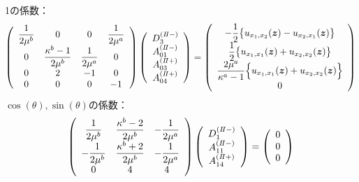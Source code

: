 1の係数：
\begin{align}
	\left(
	\begin{array}{cccc}
		{\displaystyle\frac{1}{2\mu^b}}& 0 & 0 & {\displaystyle\frac{1}{2\mu^a}} \\
		0 & {\displaystyle\frac{\kappa^b-1}{2\mu^b}} & {\displaystyle\frac{1}{2\mu^a}} & 0 \\
		0 & 2 & -1 & 0 \\
		0 & 0 & 0 & -1 \\
	\end{array}
	\right)
	\left(
	\begin{array}{c}
		D_{3}^{(I\hspace{-.15em}I-)} \\
	 	A_{01}^{(I\hspace{-.15em}I-)} \\
		A_{03}^{(I\hspace{-.15em}I+)}\\
	 	A_{04}^{(I\hspace{-.15em}I+)} \\
	\end{array}
	\right)
	=
	\left(
	\begin{array}{c}
	 	{\displaystyle-\frac{1}{2}\bigl\{u_{x_{1},x_{2}}(\bm{z})-u_{x_{2},x_{1}}(\bm{z})\bigr\}} \\
		{\displaystyle\frac{1}{2}\bigl\{u_{x_{1},x_{1}}(\bm{z})+u_{x_{2},x_{2}}(\bm{z})\bigr\}} \\
		{\displaystyle\frac{2\mu^a}{\kappa^a-1}\Bigl\{ u_{x_{1},x_{1}}(\bm{z})+ u_{x_{2},x_{2}}(\bm{z})\Bigr\}} \\
	 	0 \\
	\end{array}
	\right)
\end{align}
$\cos(\theta),\sin(\theta)$の係数：
\begin{align}
	\left(
	\begin{array}{ccc}
		{\displaystyle\frac{1}{2\mu^b}}& {\displaystyle\frac{\kappa^b-2}{2\mu^b}} & {\displaystyle-\frac{1}{2\mu^a}} \\
		{\displaystyle-\frac{1}{2\mu^b}} & {\displaystyle\frac{\kappa^b+2}{2\mu^b}} & {\displaystyle-\frac{1}{2\mu^a}} \\
		0 & 4 & 4 \\
	\end{array}
	\right)
	\left(
	\begin{array}{c}
		D_{1}^{(I\hspace{-.15em}I-)} \\
	 	A_{11}^{(I\hspace{-.15em}I-)} \\
	 	A_{14}^{(I\hspace{-.15em}I+)} \\
	\end{array}
	\right)
	=
	\left(
	\begin{array}{c}
		0 \\
	 	0 \\
	 	0 \\
	\end{array}
	\right)
\end{align}
